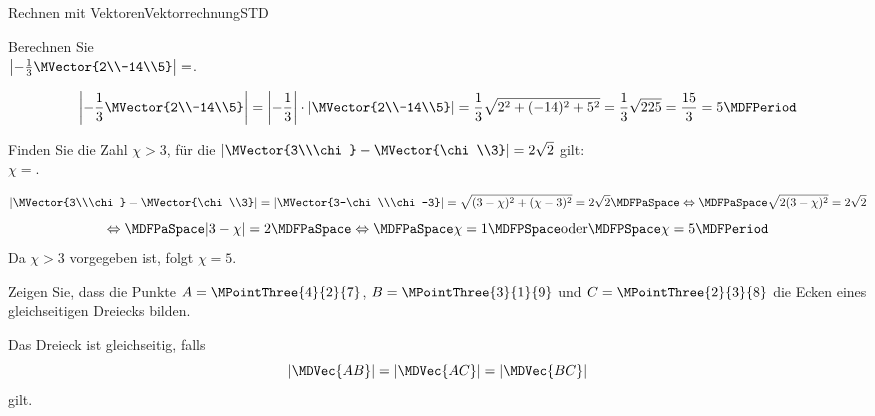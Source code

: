 \begin{MXContent}{Rechnen mit Vektoren}{Vektorrechnung}{STD}
\begin{MExample}
\end{MExample}

\begin{MExercise}
Berechnen Sie\\
$\left|-\frac{1}{3}\MVector{2\\-14\\5}\right|=$.
\begin{MHint}{\iSolution}
\[
 \left|-\frac{1}{3}\MVector{2\\-14\\5}\right|=\left|-\frac{1}{3}\right|\cdot\left|\MVector{2\\-14\\5}\right|=\frac{1}{3}\sqrt{2^2+(-14)^2+5^2}=\frac{1}{3}\sqrt{225}=\frac{15}{3}=5 \MDFPeriod
\]
 
\end{MHint}

\end{MExercise}


\begin{MExercise}
Finden Sie die Zahl $\chi>3$, für die $\left|\MVector{3\\\chi}-\MVector{\chi\\3}\right|=2\sqrt{2}$ gilt:\\
$\chi=$.
\end{MExercise}

\begin{MHint}{\iSolution}
\[
\left|\MVector{3\\\chi}-\MVector{\chi\\3}\right| =\left|\MVector{3-\chi\\\chi-3}\right|=\sqrt{(3-\chi)^2+(\chi-3)^2}=2\sqrt{2}\MDFPaSpace\Leftrightarrow\MDFPaSpace\sqrt{2(3-\chi)^2}=2\sqrt{2}
\]
\[
 \Leftrightarrow\MDFPaSpace|3-\chi|=2\MDFPaSpace\Leftrightarrow\MDFPaSpace\chi=1\MDFPSpace\textrm{oder}\MDFPSpace\chi=5 \MDFPeriod
\]
Da $\chi>3$ vorgegeben ist, folgt $\chi=5$.
\end{MHint}

\begin{MExercise}
Zeigen Sie, dass die Punkte $A=\MPointThree{4}{2}{7}$, $B=\MPointThree{3}{1}{9}$ und $C=\MPointThree{2}{3}{8}$ die Ecken eines gleichseitigen Dreiecks bilden. 
\end{MExercise}

\begin{MHint}{\iSolution}
Das Dreieck ist gleichseitig, falls
\[
 |\MDVec{A B}| = |\MDVec{A C}| = |\MDVec{B C}|
\]
gilt.


\end{MHint}
\end{MXContent}

